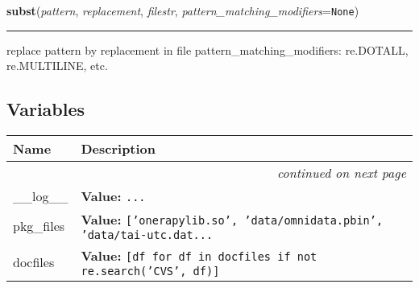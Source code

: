 \hspace{.8\funcindent}\begin{boxedminipage}{\funcwidth}

    \raggedright \textbf{subst}(\textit{pattern}, \textit{replacement}, \textit{filestr}, \textit{pattern\_matching\_modifiers}={\tt None})

    \vspace{-1.5ex}

    \rule{\textwidth}{0.5\fboxrule}
\setlength{\parskip}{2ex}
    replace pattern by replacement in file pattern\_matching\_modifiers: 
    re.DOTALL, re.MULTILINE, etc.

\setlength{\parskip}{1ex}
    \end{boxedminipage}



  \subsection{Variables}

    \vspace{-1cm}
\hspace{\varindent}\begin{longtable}{|p{\varnamewidth}|p{\vardescrwidth}|l}
\cline{1-2}
\cline{1-2} \centering \textbf{Name} & \centering \textbf{Description}& \\
\cline{1-2}
\endhead\cline{1-2}\multicolumn{3}{r}{\small\textit{continued on next page}}\\\endfoot\cline{1-2}
\endlastfoot\raggedright \_\-\_\-l\-o\-g\-\_\-\_\- & \raggedright \textbf{Value:} 
{\tt \texttt{...}}&\\
\cline{1-2}
\raggedright p\-k\-g\-\_\-f\-i\-l\-e\-s\- & \raggedright \textbf{Value:} 
{\tt ['onerapylib.so', 'data/omnidata.pbin', 'data/tai-utc.dat\texttt{...}}&\\
\cline{1-2}
\raggedright d\-o\-c\-f\-i\-l\-e\-s\- & \raggedright \textbf{Value:} 
{\tt [df for df in docfiles if not re.search('CVS', df)]}&\\
\cline{1-2}
\end{longtable}

